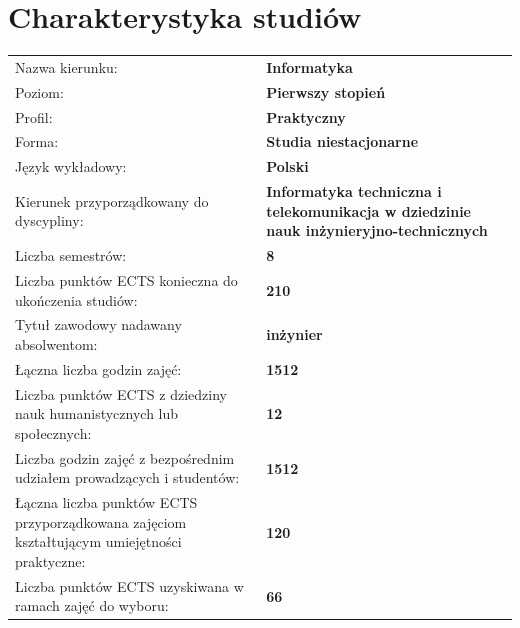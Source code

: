 \documentclass[12pt,a4paper]{article}
\renewcommand{\arraystretch}{1.35}
\begin{document}
\vspace{1cm}
\thispagestyle{empty}
\newpage
\setcounter{page}{1}

\tableofcontents
\newpage

\section{Charakterystyka studiów}

{\renewcommand{\arraystretch}{1.4}
\begin{tabularx}{\textwidth}{@{}Xp{8.5cm}@{}}
\toprule
  {\small Nazwa kierunku:} & {\small\textbf{Informatyka}} \\
  {\small Poziom:} & {\small\textbf{Pierwszy stopień}} \\
  {\small Profil:} & {\small\textbf{Praktyczny}} \\
  {\small Forma:} & {\small\textbf{Studia niestacjonarne}} \\
  {\small Język wykładowy:} & {\small\textbf{Polski}} \\
  {\small Kierunek przyporządkowany do dyscypliny:} & {\small\textbf{Informatyka techniczna i telekomunikacja w dziedzinie nauk inżynieryjno-technicznych}} \\
\midrule
  {\small Liczba semestrów:} & {\small\textbf{8}} \\
  {\small Liczba punktów ECTS konieczna do ukończenia studiów:} & {\small\textbf{210}} \\
  {\small Tytuł zawodowy nadawany absolwentom:} & {\small\textbf{inżynier}} \\
\midrule
  {\small Łączna liczba godzin zajęć:} & {\small\textbf{1512}} \\
  {\small Liczba punktów ECTS z dziedziny nauk humanistycznych lub społecznych:} & {\small\textbf{12}} \\
  {\small Liczba godzin zajęć z bezpośrednim udziałem prowadzących i studentów:} & {\small\textbf{1512}} \\
  {\small Łączna liczba punktów ECTS przyporządkowana zajęciom kształtującym umiejętności praktyczne:} & {\small\textbf{120}} \\
  {\small Liczba punktów ECTS uzyskiwana w ramach zajęć do wyboru:} & {\small\textbf{66}} \\
\bottomrule
\end{tabularx}}

\bigskip
\end{document}
